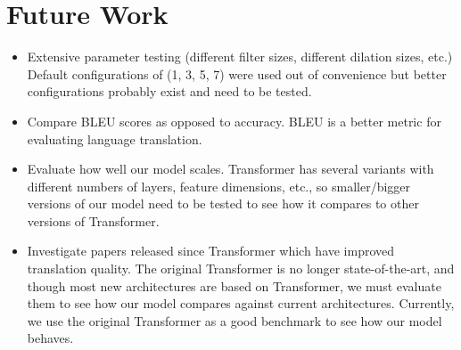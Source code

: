 \documentclass{article}
\begin{document}
	\section{Future Work}
	\begin{itemize}
		\itemsep0em
		\item Extensive parameter testing (different filter sizes, different dilation sizes, etc.)  Default configurations of (1, 3, 5, 7) were used out of convenience but better configurations probably exist and need to be tested.
		\item Compare BLEU scores as opposed to accuracy.  BLEU is a better metric for evaluating language translation.
		\item Evaluate how well our model scales.  Transformer has several variants with different numbers of layers, feature dimensions, etc., so smaller/bigger versions of our model need to be tested to see how it compares to other versions of Transformer.
		\item Investigate papers released since Transformer which have improved translation quality.  The original Transformer is no longer state-of-the-art, and though most new architectures are based on Transformer, we must evaluate them to see how our model compares against current architectures.  Currently, we use the original Transformer as a good benchmark to see how our model behaves.
	\end{itemize}
	
\end{document}

